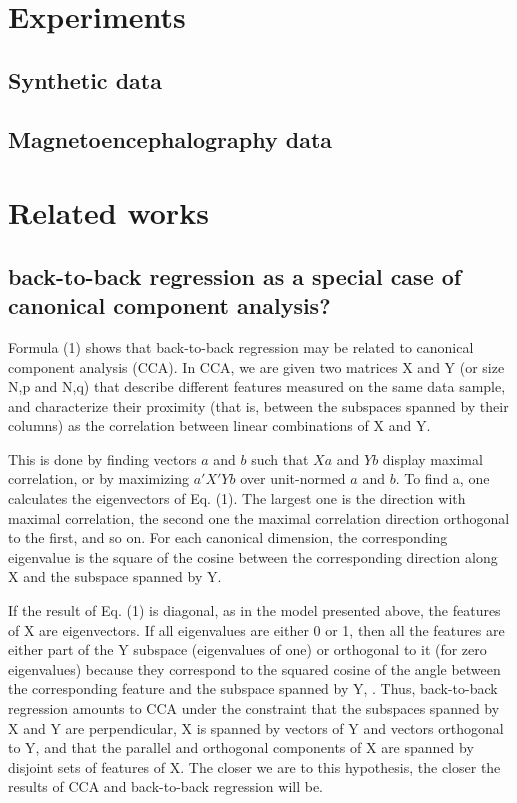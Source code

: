 \documentclass{article}
\begin{document}
\section{Experiments}
\subsection{Synthetic data}



\subsection{Magnetoencephalography data}



\section{Related works}
\subsection{back-to-back regression as a special case of canonical component analysis?}
Formula (1) shows that back-to-back regression may be related to canonical component analysis (CCA).
%
In CCA, we are given two matrices X and Y (or size N,p and N,q) that describe different features measured on the same data sample, and characterize their proximity (that is, between the subspaces spanned by their columns) as the correlation between linear combinations of X and Y.

This is done by finding vectors $a$ and $b$ such that $Xa$ and $Yb$ display maximal correlation, or by maximizing $a'X'Yb$ over unit-normed $a$ and $b$.
%
To find a, one calculates the eigenvectors of Eq. (1).
%
The largest one is the direction with maximal correlation, the second one the maximal correlation direction orthogonal to the first, and so on.
%
For each canonical dimension, the corresponding eigenvalue is the square of the cosine between the corresponding direction along X and the subspace spanned by Y.

If the result of Eq. (1) is diagonal, as in the model presented above, the features of X are eigenvectors.
%
If all eigenvalues are either 0 or 1, then all the features are either part of the Y subspace (eigenvalues of one) or orthogonal to it (for zero eigenvalues) because they correspond to the squared cosine of the angle between the corresponding feature and the subspace spanned by Y, .
%
Thus, back-to-back regression amounts to CCA under the constraint that the subspaces spanned by X and Y are perpendicular, X is spanned by vectors of Y and vectors orthogonal to Y, and that the parallel and orthogonal components of X are spanned by disjoint sets of features of X.
%
The closer we are to this hypothesis, the closer the results of CCA and back-to-back regression will be.
\end{document}

